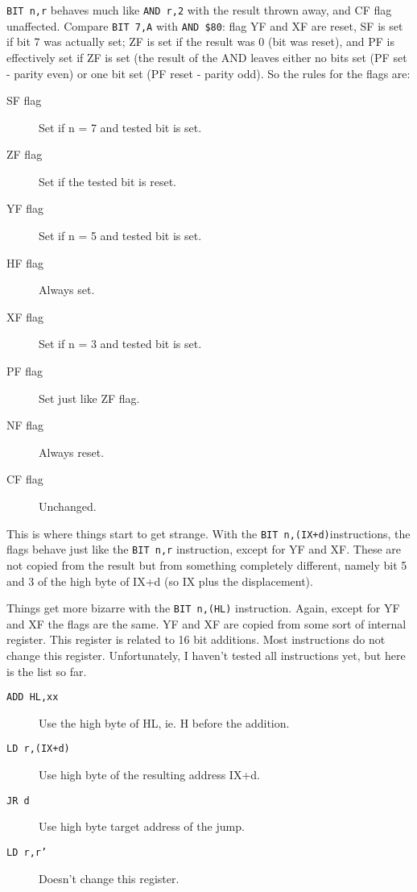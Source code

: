 \documentclass[12pt,twoside,openright,a4paper]{book}
\begin{document}
{\tt BIT n,r} behaves much like {\tt AND r,2{\raisebox{1ex}{n}}} with the result thrown away, and CF flag unaffected. Compare {\tt BIT 7,A} with {\tt AND \$80}: flag YF and XF are reset, SF is set if bit 7 was actually set; ZF is set if the result was 0 (bit was reset), and PF is effectively set if ZF is set (the result of the AND leaves either no bits set (PF set - parity even) or one bit set (PF reset - parity odd). So the rules for the flags are:

\begin{description}

	\item[SF flag]
	Set if n = 7 and tested bit is set.

	\item[ZF flag]
	Set if the tested bit is reset.

	\item[YF flag]
	Set if n = 5 and tested bit is set.

	\item[HF flag]
	Always set.

	\item[XF flag]
	Set if n = 3 and tested bit is set.

	\item[PF flag]
	Set just like ZF flag.

	\item[NF flag]
	Always reset. 

	\item[CF flag]
	Unchanged.

\end{description}

This is where things start to get strange. With the {\tt BIT n,(IX+d)}instructions, the flags behave just like the {\tt BIT n,r} instruction, except for YF and XF. These are not copied from the result but from something completely different, namely bit 5 and 3 of the high byte of IX+d (so IX plus the displacement).

Things get more bizarre with the {\tt BIT n,(HL)} instruction. Again, except for YF and XF the flags are the same. YF and XF are copied from some sort of internal register. This register is related to 16 bit additions. Most instructions do not change this register. Unfortunately, I haven't tested all instructions yet, but here is the list so far.

\begin{description}

	\item[{\tt ADD HL,xx}]
	Use the high byte of HL, ie. H before the addition.

	\item[{\tt LD r,(IX+d)}]
	Use high byte of the resulting address IX+d.

	\item[{\tt JR d}]
	Use high byte target address of the jump.

	\item[{\tt LD r,r'}]
	Doesn't change this register.

\end{description}
\end{document}
